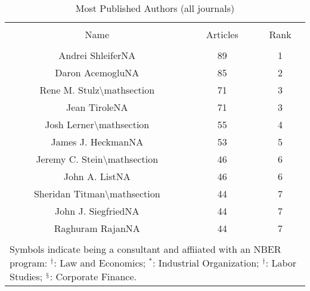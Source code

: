 
\begin{table}[!htbp] \centering 
  \caption{Most Published Authors (all journals)} 
  \label{} 
\begin{tabular}{@{\extracolsep{5pt}} ccc} 
\\[-1.8ex]\hline 
\hline \\[-1.8ex] 
Name & Articles & Rank \\ 
\hline \\[-1.8ex] 
Andrei ShleiferNA & 89 & 1 \\ 
Daron AcemogluNA & 85 & 2 \\ 
Rene M. Stulz\textbackslash mathsection & 71 & 3 \\ 
Jean TiroleNA & 71 & 3 \\ 
Josh Lerner\textbackslash mathsection & 55 & 4 \\ 
James J. HeckmanNA & 53 & 5 \\ 
Jeremy C. Stein\textbackslash mathsection & 46 & 6 \\ 
John A. ListNA & 46 & 6 \\ 
Sheridan Titman\textbackslash mathsection & 44 & 7 \\ 
John J. SiegfriedNA & 44 & 7 \\ 
Raghuram RajanNA & 44 & 7 \\ 
\hline \\[-1.8ex] 
\multicolumn{3}{l}{Symbols indicate being a consultant and affiiated with an NBER program: $^{\dag}$: Law and Economics; $^{*}$: Industrial Organization; $^{\dag}$: Labor Studies; $^{\mathsection}$: Corporate Finance.} \\ 
\end{tabular} 
\end{table} 
